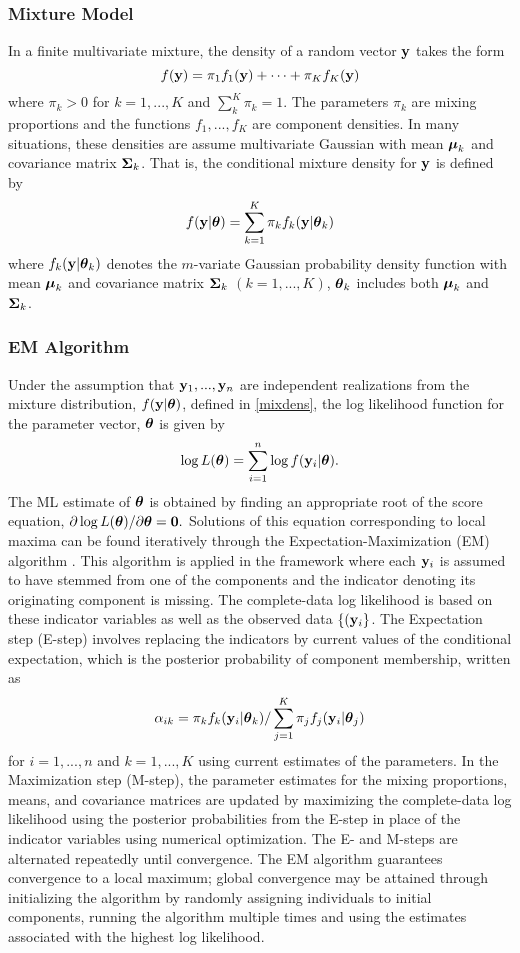 \subsubsection{Mixture Model}
In a finite multivariate mixture, the density of a random vector $\mathbf y$ takes the form
$$f(\mathbf y)=\pi_{1}f_{1}(\mathbf y)+\cdots+\pi_{K}f_{K}(\mathbf y)$$
where $\pi_{k}>0$ for $k=1,...,K$ and $\sum^{K}_{k}\pi_{k}=1$. The parameters $\pi_{k}$ are mixing proportions and the functions $f_{1},...,f_{K}$ are component densities. In many situations, these densities are assume multivariate Gaussian with mean $\boldsymbol\mu_{k}$ and covariance matrix $\boldsymbol\Sigma_{k}$. That is, the conditional mixture density for $\mathbf y$ is defined by
\begin{align}
f(\mathbf y|\boldsymbol \theta)=\sum^{K}_{k=1}\pi_{k}f_{k}(\mathbf y|\boldsymbol\theta_{k}) \label{mixdens}
\end{align}
where $f_{k}(\mathbf y|\boldsymbol\theta_{k})$ denotes the $m$-variate Gaussian probability density function with mean $\boldsymbol\mu_{k}$ and covariance matrix $\boldsymbol\Sigma_{k}$ $(k=1,...,K)$, $\boldsymbol\theta_{k}$ includes both $\boldsymbol\mu_{k}$ and $\boldsymbol\Sigma_{k}$. 
\subsubsection{EM Algorithm}
Under the assumption that $\mathbf y_{1},...,\mathbf y_{n}$ are independent realizations from the mixture distribution, $f(\mathbf y | \boldsymbol\theta)$, defined in \ref{mixdens}, the log likelihood function for the parameter vector, $\boldsymbol \theta$ is given by
$$\log L(\boldsymbol\theta)=\sum^{n}_{i=1}\log f(\mathbf y_{i}|\boldsymbol \theta).$$
The ML estimate of $\boldsymbol\theta$ is obtained by finding an appropriate root of the score equation, $\partial \log L(\boldsymbol\theta)/\partial \boldsymbol\theta=\mathbf 0.$
Solutions of this equation corresponding to local maxima can be found iteratively through the Expectation-Maximization (EM) algorithm \cite{dempster1977}. This algorithm is applied in the framework where each $\mathbf y_{i}$ is assumed to have stemmed from one of the components and the indicator denoting its originating component is missing. The complete-data log likelihood is based on these indicator variables as well as the observed data $\{(\mathbf y_{i}\}$. The Expectation step (E-step) involves replacing the indicators by current values of the conditional expectation, which is the posterior probability of component membership, written as
$$\alpha_{ik}=\pi_{k}f_{k}(\mathbf y_{i}|\boldsymbol\theta_{k})/\sum_{j=1}^{K}\pi_{j}f_{j}(\mathbf y_{i}|\boldsymbol \theta_{j})$$
for $i=1,...,n$ and $k=1,...,K$ using current estimates of the parameters. In the Maximization step (M-step), the parameter estimates for the mixing proportions, means, and covariance matrices are updated by maximizing the complete-data log likelihood using the posterior probabilities from the E-step in place of the indicator variables using numerical optimization. The E- and M-steps are alternated repeatedly until convergence. The EM algorithm guarantees convergence to a local maximum; global convergence may be attained through initializing the algorithm by randomly assigning individuals to initial components, running the algorithm multiple times and using the estimates associated with the highest log likelihood.\\

